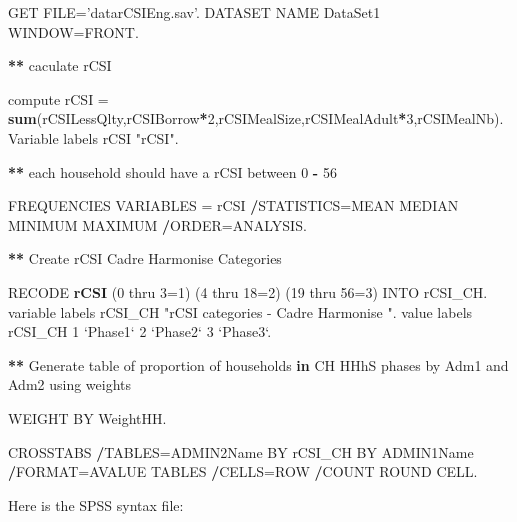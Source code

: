 \documentclass[
]{book}
\newenvironment{Shaded}{\begin{snugshade}}{\end{snugshade}}
\newcommand{\ControlFlowTok}[1]{\textcolor[rgb]{0.13,0.29,0.53}{\textbf{#1}}}
\newcommand{\DataTypeTok}[1]{\textcolor[rgb]{0.13,0.29,0.53}{#1}}
\newcommand{\DecValTok}[1]{\textcolor[rgb]{0.00,0.00,0.81}{#1}}
\newcommand{\KeywordTok}[1]{\textcolor[rgb]{0.13,0.29,0.53}{\textbf{#1}}}
\newcommand{\NormalTok}[1]{#1}
\newcommand{\OperatorTok}[1]{\textcolor[rgb]{0.81,0.36,0.00}{\textbf{#1}}}
\newcommand{\StringTok}[1]{\textcolor[rgb]{0.31,0.60,0.02}{#1}}
\begin{document}
\begin{Shaded}
\begin{Highlighting}[]
\NormalTok{GET  FILE=}\StringTok{'datarCSIEng.sav'}\NormalTok{.}
\NormalTok{DATASET NAME DataSet1 WINDOW=FRONT.}

\OperatorTok{**}\StringTok{ }\NormalTok{caculate rCSI}

\NormalTok{compute rCSI =}\StringTok{ }\KeywordTok{sum}\NormalTok{(rCSILessQlty,rCSIBorrow}\OperatorTok{*}\DecValTok{2}\NormalTok{,rCSIMealSize,rCSIMealAdult}\OperatorTok{*}\DecValTok{3}\NormalTok{,rCSIMealNb).}
\NormalTok{Variable labels rCSI }\StringTok{"rCSI"}\NormalTok{.}

\OperatorTok{**}\StringTok{ }\NormalTok{each household should have a rCSI between }\DecValTok{0} \OperatorTok{-}\StringTok{ }\DecValTok{56}

\NormalTok{FREQUENCIES VARIABLES =}\StringTok{  }\NormalTok{rCSI}
\OperatorTok{/}\NormalTok{STATISTICS=MEAN MEDIAN MINIMUM MAXIMUM}
\OperatorTok{/}\NormalTok{ORDER=ANALYSIS.}

\OperatorTok{**}\StringTok{ }\NormalTok{Create rCSI Cadre Harmonise Categories}

\NormalTok{RECODE }\KeywordTok{rCSI}\NormalTok{ (}\DecValTok{0}\NormalTok{ thru }\DecValTok{3}\NormalTok{=}\DecValTok{1}\NormalTok{) (}\DecValTok{4}\NormalTok{ thru }\DecValTok{18}\NormalTok{=}\DecValTok{2}\NormalTok{) (}\DecValTok{19}\NormalTok{ thru }\DecValTok{56}\NormalTok{=}\DecValTok{3}\NormalTok{) INTO rCSI_CH.}
\NormalTok{variable labels rCSI_CH }\StringTok{"rCSI categories - Cadre Harmonise "}\NormalTok{.}
\NormalTok{value labels rCSI_CH}
\DecValTok{1} \StringTok{`}\DataTypeTok{Phase1}\StringTok{`}
\DecValTok{2} \StringTok{`}\DataTypeTok{Phase2}\StringTok{`}
\DecValTok{3} \StringTok{`}\DataTypeTok{Phase3}\StringTok{`}\NormalTok{.}

\OperatorTok{**}\StringTok{ }\NormalTok{Generate table of proportion of households }\ControlFlowTok{in}\NormalTok{ CH HHhS phases by Adm1 and Adm2 using weights}

\NormalTok{WEIGHT BY WeightHH.}

\NormalTok{CROSSTABS}
  \OperatorTok{/}\NormalTok{TABLES=ADMIN2Name BY rCSI_CH BY ADMIN1Name}
  \OperatorTok{/}\NormalTok{FORMAT=AVALUE TABLES}
  \OperatorTok{/}\NormalTok{CELLS=ROW }
  \OperatorTok{/}\NormalTok{COUNT ROUND CELL.}
\end{Highlighting}
\end{Shaded}

Here is the SPSS syntax file:
\end{document}

